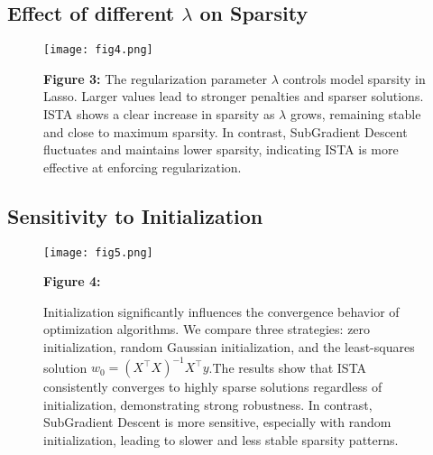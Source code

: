 \documentclass[11pt]{article}
\begin{document}


\subsection{Effect of different $\lambda$ on Sparsity}

\begin{figure}[H]
\centering
\begin{minipage}{0.3\textwidth}
    \texttt{[image: fig4.png]}
\end{minipage}
\hfill
\begin{minipage}{0.5\textwidth}
    \small
    \textbf{Figure 3:} 
The regularization parameter \( \lambda \) controls model sparsity in Lasso. Larger values lead to stronger penalties and sparser solutions.
ISTA shows a clear increase in sparsity as \( \lambda \) grows, remaining stable and close to maximum sparsity. In contrast, SubGradient Descent fluctuates and maintains lower sparsity, indicating ISTA is more effective at enforcing regularization.
\end{minipage}
\end{figure}




\subsection{Sensitivity to Initialization}

\begin{figure}[H]
\centering
\begin{minipage}{0.3\textwidth}
    \texttt{[image: fig5.png]}
\end{minipage}
\hfill
\begin{minipage}{0.5\textwidth}
    \small
    \textbf{Figure 4:} 

Initialization significantly influences the convergence behavior of optimization algorithms. We compare three strategies: zero initialization, random Gaussian initialization, and the least-squares solution \( w_0 = (X^\top X)^{-1} X^\top y \).The results show that ISTA consistently converges to highly sparse solutions regardless of initialization, demonstrating strong robustness. In contrast, SubGradient Descent is more sensitive, especially with random initialization, leading to slower and less stable sparsity patterns.


\end{minipage}
\end{figure}
\end{document}
